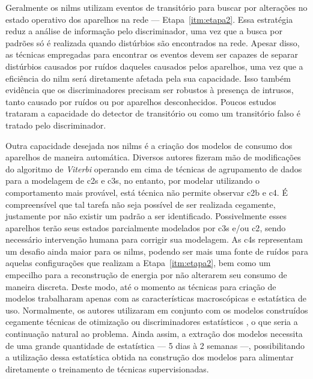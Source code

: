 Geralmente os \glspl{nilm} utilizam eventos de transitório para buscar
por alterações no estado operativo dos aparelhos na rede ---
Etapa~\ref{itm:etapa2}. Essa estratégia reduz a análise de informação
pelo discriminador, uma vez que a busca por padrões só é realizada
quando distúrbios são encontrados na rede. Apesar disso, as técnicas
empregadas para encontrar os eventos devem ser capazes de separar
distúrbios causados por ruídos daqueles causados pelos aparelhos, uma
vez que a eficiência do \gls{nilm} será diretamente afetada pela sua
capacidade. Isso também evidência que os discriminadores precisam ser
robustos à presença de intrusos, tanto causado por ruídos ou por
aparelhos desconhecidos. Poucos estudos trataram a capacidade do
detector de transitório ou como um transitório falso é tratado pelo
discriminador.

Outra capacidade desejada nos \glspl{nilm} é a criação dos modelos
de consumo dos aparelhos de maneira automática. Diversos
autores fizeram mão de modificações do algoritmo de \emph{Viterbi}
\cite{nilm_bouloutas_viterbi_ext_1991_11,
nilm_hart_fsm_viterbi_1993_12,nilm_baranski_genetic_base_2003_19,
nilm_baranski_genetic_detalhado_2004_20,nilm_baranski_summary_2004_21,
nilm_bergman_distribuido_2011,nilm_zeifman_vast_2011,
nilm_zeifman_vastext_approach_2012,
nilm_zeifman_statistical_vastext_1stws_2012,
seminilm_fhmm_empiricalnmeter_2013}
operando em cima de técnicas de agrupamento de dados para a modelagem
de \glspl{c2} e \glspl{c3}, no entanto, por modelar utilizando o
comportamento mais provável, está técnica não permite observar
\gls{c2b} e \gls{c4}. É compreensível que tal tarefa não seja possível
de ser realizada cegamente, justamente por não existir um padrão a ser
identificado. Possivelmente esses aparelhos terão seus estados
parcialmente modelados por \glspl{c3} e/ou \gls{c2}, sendo necessário
intervenção humana para corrigir sua modelagem. As \glspl{c4}
representam um desafio ainda maior para os \glspl{nilm}, podendo ser
mais uma fonte de ruídos para aquelas configurações que realizam a
Etapa~\ref{itm:etapa2}, bem como um empecilho para a reconstrução de
energia por não alterarem seu consumo de maneira discreta. Deste modo,
até o momento as técnicas para criação de modelos trabalharam apenas
com as características macroscópicas e estatística de uso.
Normalmente, os autores utilizaram em conjunto com os modelos
construídos cegamente técnicas de otimização
\cite{nilm_bergman_distribuido_2011} ou discriminadores estatísticos
\cite{nilm_zeifman_vast_2011, nilm_zeifman_vastext_approach_2012,
nilm_zeifman_statistical_vastext_1stws_2012,
seminilm_fhmm_empiricalnmeter_2013}, o que seria a continuação natural
ao problema. Ainda assim, a extração dos modelos necessita de uma
grande quantidade de estatística --- 5 dias à 2 semanas ---,
possibilitando a utilização dessa estatística obtida na construção dos
modelos para alimentar diretamente o treinamento de técnicas
supervisionadas.

